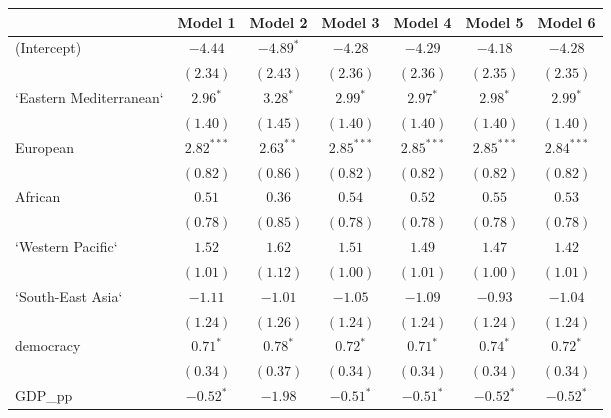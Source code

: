 
\begin{table}[!h]
\begin{center}
\begin{tabular}{l c c c c c c }
\toprule
 & Model 1 & Model 2 & Model 3 & Model 4 & Model 5 & Model 6 \\
\midrule
(Intercept)             & $-4.44$      & $-4.89^{*}$  & $-4.28$      & $-4.29$      & $-4.18$      & $-4.28$      \\
                        & $(2.34)$     & $(2.43)$     & $(2.36)$     & $(2.36)$     & $(2.35)$     & $(2.35)$     \\
`Eastern Mediterranean` & $2.96^{*}$   & $3.28^{*}$   & $2.99^{*}$   & $2.97^{*}$   & $2.98^{*}$   & $2.99^{*}$   \\
                        & $(1.40)$     & $(1.45)$     & $(1.40)$     & $(1.40)$     & $(1.40)$     & $(1.40)$     \\
European                & $2.82^{***}$ & $2.63^{**}$  & $2.85^{***}$ & $2.85^{***}$ & $2.85^{***}$ & $2.84^{***}$ \\
                        & $(0.82)$     & $(0.86)$     & $(0.82)$     & $(0.82)$     & $(0.82)$     & $(0.82)$     \\
African                 & $0.51$       & $0.36$       & $0.54$       & $0.52$       & $0.55$       & $0.53$       \\
                        & $(0.78)$     & $(0.85)$     & $(0.78)$     & $(0.78)$     & $(0.78)$     & $(0.78)$     \\
`Western Pacific`       & $1.52$       & $1.62$       & $1.51$       & $1.49$       & $1.47$       & $1.42$       \\
                        & $(1.01)$     & $(1.12)$     & $(1.00)$     & $(1.01)$     & $(1.00)$     & $(1.01)$     \\
`South-East Asia`       & $-1.11$      & $-1.01$      & $-1.05$      & $-1.09$      & $-0.93$      & $-1.04$      \\
                        & $(1.24)$     & $(1.26)$     & $(1.24)$     & $(1.24)$     & $(1.24)$     & $(1.24)$     \\
democracy               & $0.71^{*}$   & $0.78^{*}$   & $0.72^{*}$   & $0.71^{*}$   & $0.74^{*}$   & $0.72^{*}$   \\
                        & $(0.34)$     & $(0.37)$     & $(0.34)$     & $(0.34)$     & $(0.34)$     & $(0.34)$     \\
GDP\_pp                 & $-0.52^{*}$  & $-1.98$      & $-0.51^{*}$  & $-0.51^{*}$  & $-0.52^{*}$  & $-0.52^{*}$  \\

\end{tabular}
\end{center}
\end{table}
